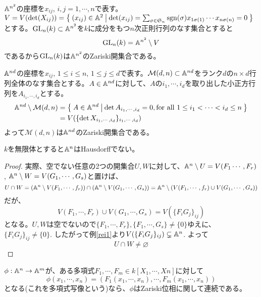 \documentclass{ltjsreport}
\begin{document}
\begin{eg}
  $\mathbb{A}^{n^2}$の座標を$x_{ij}$, $i,j=1,\cdots,n$で表す。\\$V=V(\det (X_{ij}))=\left\{\:(x_{ij})\in\mathbb{A}^2\:\middle|\:\det(x_{ij})=\sum_{\sigma\in\mathfrak{S}_n}\mathrm{sgn}(\sigma)x_{1\sigma(1)}\cdots x_{n\sigma(n)}=0\:\right\}$とする。$\text{GL}_n(k)\subset \mathbb{A}^{n^2}$を$k$に成分をもつ$n$次正則行列のなす集合とすると
  \[
  \text{GL}_n(k)=\mathbb{A}^{n^2}\setminus V  
  \]
  であるから$\text{GL}_n(k)$は$\mathbb{A}^{n^2}$のZariski開集合である。
\end{eg}

\begin{eg}\label{M_d,n}
  $\mathbb{A}^{nd}$の座標を$x_{ij}$, $1\leq i\leq n$, $1\leq j\leq d$で表す。$\mathcal{M}(d,n)\subset\mathbb{A}^{nd}$をランク$d$の$n\times d$行列全体のなす集合とする。$A\in\mathbb{A}^{nd}$に対して、$A$の$i_1,\cdots,i_d$を取り出した小正方行列を$A_{i_1,\cdots,i_d}$とする。
  \begin{align*}
  \mathbb{A}^{nd}\setminus \mathcal{M}(d,n)
  &=\left\{\:A\in\mathbb{A}^{nd}\:\middle|\:\det A_{i_1,\cdots,i_d}=0, \text{for all $1\leq i_1<\cdots<i_d\leq n$}\:\right\}\\
  &=V(\{\det X_{i_1,\cdots,i_d}\}_{i_1,\cdots,i_d})
  \end{align*}
  よって$\mathcal{M}(d,n)$は$\mathbb{A}^{nd}$のZariski開集合である。
\end{eg}

\begin{prop}
  $k$を無限体とすると$\mathbb{A}^n$はHausdorffでない。
\end{prop}

\begin{proof}
  実際、空でない任意の2つの開集合$U,W$に対して、$\mathbb{A}^n\setminus U=V(F_1\cdots,F_r)$, $\mathbb{A}^n\setminus W=V(G_1,\cdots,G_s)$と置けば、
  \[
  U\cap W=(\mathbb{A}^n \setminus V(F_1,\cdots,f_r))\cap (\mathbb{A}^n \setminus V(G_1,\cdots,G_s))=\mathbb{A}^n\setminus(V(F_1,\cdots,f_r)\cup V(G_1,\cdots,G_s))  
  \]
  だが、
  \[
    V(F_1,\cdots,F_r)\cup V(G_1,\cdots,G_s)=V(\{F_iG_j\}_{ij}) 
  \]
  となる。$U,W$は空でないので$\{F_1,\cdots,F_r\},\{F_1,\cdots,G_s\}\neq \{0\}$ゆえに、$\{F_iG_j\}_{ij}\neq \{0\}$. したがって例\ref{rei1}より$V(\{F_iG_j\}_{ij})\subsetneq \mathbb{A}^n$. よって
  \[
  U\cap W\neq \varnothing
  \]
\end{proof}

\begin{prop}\label{continuity}
  $\phi:\mathbb{A}^n\rightarrow \mathbb{A}^m$が、ある多項式$F_1,\cdots,F_m\in k[X_1,\cdots,Xn]$に対して
  \[
  \phi(x_1,\cdots,x_n)=(F_1(x_1,\cdots,x_n),\cdots,F_m(x_1,\cdots,x_n))  
  \]
  となる(これを多項式写像という)なら、$\phi$はZariski位相に関して連続である。
\end{prop}
\end{document}
